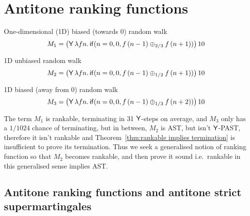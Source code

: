 \section{Antitone ranking functions}
\label{sec:antitone}

\begin{example}
\label{ex:ac-ranking}
\begin{compactenum}[(i)]
\item One-dimensional (1D) biased (towards 0) random walk
\[
M_1 = 
\big(\mathsf{Y} \, \lambda f n . \, 
\mathsf{if}(n = 0, 0, f \, (n - 1) \oplus_{2/3} f \, (n + 1))\big) \, 10
\]

\item 1D unbiased random walk
\[
M_2 = 
\big(\mathsf{Y} \, \lambda f n . \, 
\mathsf{if}(n = 0, 0, f \, (n - 1) \oplus_{1/2} f \, (n + 1))\big) \, 10
\]

\item 1D biased (away from 0) random walk
\[
M_3 = 
\big(\mathsf{Y} \, \lambda f n . \, 
\mathsf{if}(n = 0, 0, f \, (n - 1) \oplus_{1/3} f \, (n + 2))\big) \, 10
\]
\end{compactenum}
\end{example}

\medskip

The term $M_1$ is rankable, terminating in 31 $\mathsf{Y}$-steps on average, and $M_3$ only has a $1/1024$ chance of terminating, but in between, $M_2$ is AST, but isn't $\mathsf{Y}$-PAST, therefore it isn't rankable and Theorem~\ref{thm:rankable implies termination} is insufficient to prove its termination. 
Thus we seek a generalised notion of ranking function so that $M_2$ becomes rankable, and then prove it sound i.e.~rankable in this generalised sense implies AST.


\subsection{Antitone ranking functions and antitone strict supermartingales}

